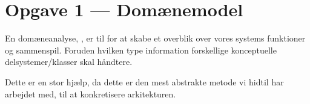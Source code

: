 \section{Opgave 1 --- Domænemodel}
En domæneanalyse, , er til for at skabe et overblik over vores systems funktioner og sammenspil. Foruden hvilken type information forskellige konceptuelle delsystemer/klasser skal håndtere.

Dette er en stor hjælp, da dette er den mest abstrakte metode vi hidtil har arbejdet med, til at konkretisere arkitekturen.

